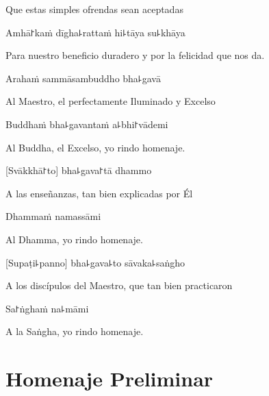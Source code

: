 \begin{english}
Que estas simples ofrendas sean aceptadas
\end{english}

Amhā꜓kaṁ dīgha꜕rattaṁ hi꜕tāya su꜕khāya

\begin{english}
Para nuestro beneficio duradero y por la felicidad que nos da.
\end{english}

\clearpage

Arahaṁ sammāsambuddho bha꜕gavā

\begin{english}
Al Maestro, el perfectamente Iluminado y Excelso
\end{english}

Buddhaṁ bha꜕gavantaṁ a꜕bhi꜓vādemi

\begin{english}
  Al Buddha, el Excelso, yo rindo homenaje.
\end{english}

[Svākkhā꜓to] bha꜕gava꜓tā dhammo

\begin{english}
 A las enseñanzas, tan bien explicadas por Él 
\end{english}

Dhammaṁ namassāmi

\begin{english}
  Al Dhamma, yo rindo homenaje.
\end{english}

[Supaṭi꜕panno] bha꜕gava꜕to sāvaka꜕saṅgho

\begin{english}
A los discípulos del Maestro, que tan bien practicaron
\end{english}

Sa꜓ṅghaṁ na꜕māmi

\begin{english}
  A la Saṅgha, yo rindo homenaje.
\end{english}

\chapter{Homenaje Preliminar}

\begin{leader}
\end{leader}

